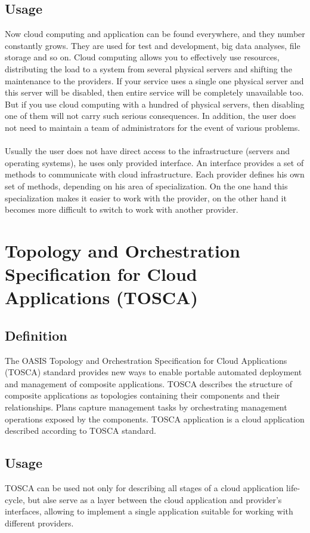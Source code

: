 \subsection{Usage}
Now cloud computing and application can be found everywhere, and they number constantly grows. \cite*{cloud_stat}
They are used for test and development, big data analyses, file storage and so on.
Cloud computing allows you to effectively use resources, distributing the load to a system from several physical servers and shifting the maintenance to the providers. 
If your service uses a single one physical server and this server will be disabled, then entire service will be completely unavailable too.
But if you use cloud computing with a hundred of physical servers, then disabling one of them will not carry such serious consequences.
In addition, the user does not need to maintain a team of administrators for the event of various problems.\\\\ 
Usually the user does not have direct access to the infrastructure (servers and operating systems), he uses only provided interface.
An interface provides a set of methods to communicate with cloud infrastructure. 
Each provider defines his own set of methods, depending on his area of specialization. 
On the one hand this specialization makes it easier to work with the provider, on the other hand it becomes more difficult to switch to work with another provider.

\section{Topology and Orchestration Specification for Cloud	Applications (TOSCA)} \label{sec:tosca}
\subsection*{Definition}
The OASIS \cite{oasis} Topology and Orchestration Specification for Cloud Applications (TOSCA) standard provides new ways to enable portable automated deployment and management of composite applications.
TOSCA describes the structure of composite applications as topologies containing their components and their relationships.
Plans capture management tasks by orchestrating management operations exposed by the components. \cite*{INBOOK-2014-01}
TOSCA application is a cloud application described according to TOSCA standard.
\subsection*{Usage}
TOSCA can be used not only for describing all stages of a cloud application life-cycle, but alse serve as a layer between the cloud application and provider's interfaces, allowing to implement a single application suitable for working with different providers. 
